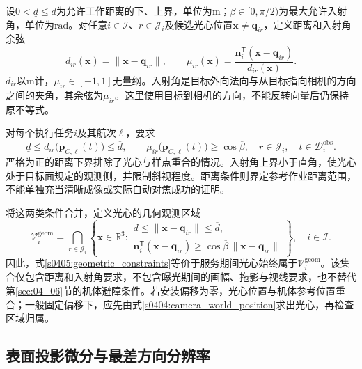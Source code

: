 设$0<\underline d\le\overline d$为允许工作距离的下、上界，单位为$\mathrm m$；$\overline\beta\in[0,\pi/2)$为最大允许入射角，单位为$\mathrm{rad}$。对任意$i\in\mathcal I$、$r\in\mathcal J_i$及候选光心位置$\mathbf x\ne\mathbf q_{ir}$，定义距离和入射角余弦
\begin{equation}
 d_{ir}(\mathbf x)=\|\mathbf x-\mathbf q_{ir}\|,
 \qquad
 \mu_{ir}(\mathbf x)=
 \frac{\mathbf n_i^{\mathsf T}(\mathbf x-\mathbf q_{ir})}
 {d_{ir}(\mathbf x)}.
 \label{s0405:range_incidence}
\end{equation}
$d_{ir}$以$\mathrm m$计，$\mu_{ir}\in[-1,1]$无量纲。入射角是目标外向法向与从目标指向相机的方向之间的夹角，其余弦为$\mu_{ir}$。这里使用目标到相机的方向，不能反转向量后仍保持原不等式。

对每个执行任务$i$及其航次$\ell$，要求
\begin{equation}
 \underline d\le d_{ir}\bigl(\mathbf p_{C,\ell}(t)\bigr)\le\overline d,
 \qquad
 \mu_{ir}\bigl(\mathbf p_{C,\ell}(t)\bigr)\ge\cos\overline\beta,
 \quad r\in\mathcal J_i,\quad t\in\mathcal D_i^{\mathrm{obs}}.
 \label{s0405:geometric_constraints}
\end{equation}
严格为正的距离下界排除了光心与样点重合的情况。入射角上界小于直角，使光心处于目标面规定的观测侧，并限制斜视程度。距离条件则界定参考作业距离范围，不能单独充当清晰成像或实际自动对焦成功的证明。

将这两类条件合并，定义光心的几何观测区域
\begin{equation}
 \mathcal V_i^{\mathrm{geom}}
 =\bigcap_{r\in\mathcal J_i}
 \left\{\mathbf x\in\mathbb R^3:
 \begin{array}{l}
 \underline d\le\|\mathbf x-\mathbf q_{ir}\|\le\overline d,\\
 \mathbf n_i^{\mathsf T}(\mathbf x-\mathbf q_{ir})
 \ge\cos\overline\beta\,\|\mathbf x-\mathbf q_{ir}\|
 \end{array}\right\},
 \quad i\in\mathcal I.
 \label{s0405:geometric_view_region}
\end{equation}
因此，式\eqref{s0405:geometric_constraints}等价于服务期间光心始终属于$\mathcal V_i^{\mathrm{geom}}$。该集合仅包含距离和入射角要求，不包含曝光期间的画幅、拖影与视线要求，也不替代第\ref{sec:04_06}节的机体避障条件。若安装偏移为零，光心位置与机体参考位置重合；一般固定偏移下，应先由式\eqref{s0404:camera_world_position}求出光心，再检查区域归属。

\subsection{表面投影微分与最差方向分辨率}

